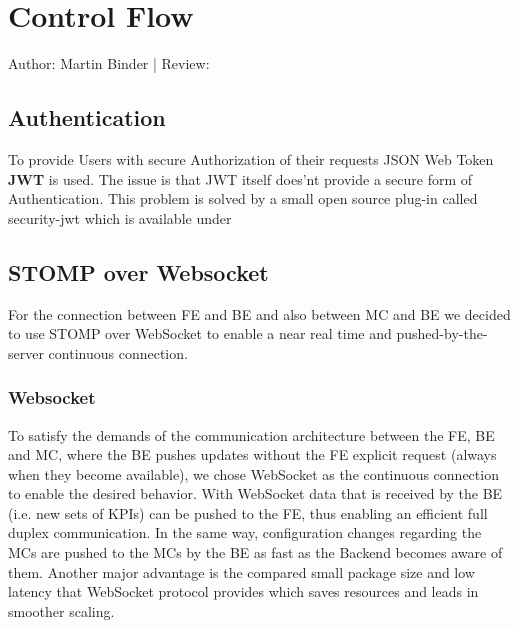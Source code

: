 \documentclass{scrreprt}
\begin{document}
\chapter{Control Flow}
Author: Martin Binder | Review: 
\section{Authentication}
To provide Users with secure Authorization of their requests JSON Web Token \textbf{JWT} is used. The issue is that JWT itself does'nt provide a secure form of Authentication. This problem is solved by a small open source plug-in called security-jwt which is available under \\

\section{STOMP over Websocket} \label{websockets}
For the connection between FE and BE and also between MC and BE we decided to use STOMP over WebSocket to enable a near real time and  pushed-by-the-server continuous connection.

\subsection{Websocket}
To satisfy the demands of the communication architecture between the FE, BE and MC, where the BE pushes updates without the FE explicit request (always when they become available), we chose WebSocket as the continuous connection to enable the desired behavior. With WebSocket data that is received by the BE (i.e. new sets of KPIs) can be pushed to the FE, thus enabling an efficient full duplex communication. In the same way, configuration changes regarding the MCs are pushed to the MCs by the BE as fast as the Backend becomes aware of them. Another major advantage is the compared small package size and low latency that WebSocket protocol provides which saves resources and leads in smoother scaling.
\end{document}
